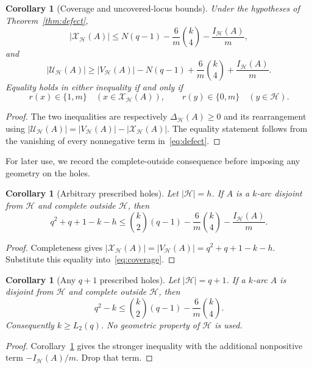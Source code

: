 \documentclass[11pt]{article}
\newtheorem{corollary}[theorem]{Corollary}
\theoremstyle{definition}
\theoremstyle{remark}
\newcommand{\cH}{\mathcal{H}}
\newcommand{\cU}{\mathcal{U}}
\newcommand{\cX}{\mathcal{X}}
\newcommand{\IH}{I_{\cH}}
\begin{document}
\begin{corollary}[Coverage and uncovered-locus bounds]
\label{cor:coverage}
Under the hypotheses of Theorem~\ref{thm:defect},
\begin{equation}
 |\cX_{\cH}(A)|\le
 N(q-1)-\frac{6}{m}\binom{k}{4}-\frac{\IH(A)}m,
\label{eq:coverage}
\end{equation}
and
\begin{equation}
 |\cU_{\cH}(A)|\ge
 |V_{\cH}(A)|-N(q-1)
 +\frac{6}{m}\binom{k}{4}+\frac{\IH(A)}m.
\label{eq:uncovered}
\end{equation}
Equality holds in either inequality if and only if
\[
 r(x)\in\{1,m\}\quad(x\in\cX_{\cH}(A)),
 \qquad
 r(y)\in\{0,m\}\quad(y\in\cH).
\]
\end{corollary}

\begin{proof}
The two inequalities are respectively $\Delta_{\cH}(A)\ge0$ and its
rearrangement using
$|\cU_{\cH}(A)|=|V_{\cH}(A)|-|\cX_{\cH}(A)|$.
The equality statement follows from the vanishing of every nonnegative term
in~\eqref{eq:defect}.
\end{proof}

For later use, we record the complete-outside consequence before imposing
any geometry on the holes.

\begin{corollary}[Arbitrary prescribed holes]
\label{cor:arbitrary-holes}
Let $|\cH|=h$.  If $A$ is a $k$-arc disjoint from $\cH$ and complete outside
$\cH$, then
\begin{equation}
 q^2+q+1-k-h\le
 \binom{k}{2}(q-1)-\frac6m\binom{k}{4}-\frac{\IH(A)}m.
\label{eq:arbitrary-holes}
\end{equation}
\end{corollary}

\begin{proof}
Completeness gives
$|\cX_{\cH}(A)|=|V_{\cH}(A)|=q^2+q+1-k-h$.
Substitute this equality into~\eqref{eq:coverage}.
\end{proof}

\begin{corollary}[Any \(q+1\) prescribed holes]
\label{cor:q-plus-one-holes}
Let \(|\cH|=q+1\).  If a \(k\)-arc \(A\) is disjoint from \(\cH\) and
complete outside \(\cH\), then
\[
 q^2-k\le
 \binom{k}{2}(q-1)-\frac6m\binom{k}{4}.
\]
Consequently \(k\ge L_2(q)\).  No geometric property of \(\cH\) is used.
\end{corollary}

\begin{proof}
Corollary~\ref{cor:arbitrary-holes} gives the stronger inequality with the
additional nonpositive term \(-\IH(A)/m\).  Drop that term.
\end{proof}
\end{document}
